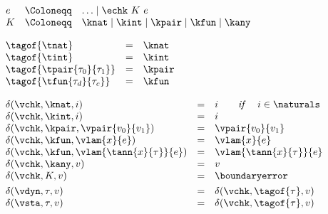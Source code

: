 {\flushleft
$\begin{array}{l c l}
  e & \Coloneqq & \ldots \mid \echk~K~e
\\
  K & \Coloneqq & \knat \mid \kint \mid \kpair \mid \kfun \mid \kany
\end{array}$

\medskip
\fbox{$\tagof{\tau} = \kappa$}
$\begin{array}{l c l}
  \tagof{\tnat} & = & \knat
\\
  \tagof{\tint} & = & \kint
\\
  \tagof{\tpair{\tau_0}{\tau_1}} & = & \kpair
\\
  \tagof{\tfun{\tau_d}{\tau_c}} & = & \kfun
\end{array}$

\medskip
{}
$\begin{array}{l c l}
  \delta(\vchk, \knat, i) & = & i \qquad \emph{if}~~~~i \in \naturals
\\
  \delta(\vchk, \kint, i) & = & i
\\
  \delta(\vchk, \kpair, \vpair{v_0}{v_1}) & = & \vpair{v_0}{v_1}
\\
  \delta(\vchk, \kfun, \vlam{x}{e}) & = & \vlam{x}{e}
\\
  \delta(\vchk, \kfun, \vlam{\tann{x}{\tau}}{e}) & = & \vlam{\tann{x}{\tau}}{e}
\\
  \delta(\vchk, \kany, v) & = & v
\\
  \delta(\vchk, K, v) & = & \boundaryerror
\\[0.8ex]
  \delta(\vdyn, \tau, v) & = & \delta(\vchk, \tagof{\tau}, v)
\\
  \delta(\vsta, \tau, v) & = & \delta(\vchk, \tagof{\tau}, v)
\end{array}$

}
